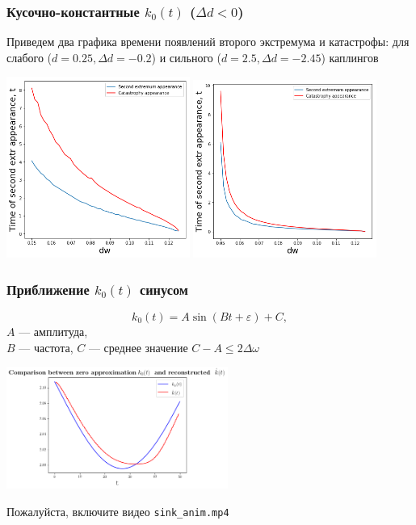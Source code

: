 \documentclass{beamer}
\begin{document}
\begin{frame}
\frametitle{Кусочно-константные $k_0(t)$ ($\Delta d <0$)}
\phantom{123} 
Приведем два графика времени появлений второго экстремума и катастрофы: для слабого ($d=0.25, \Delta d=-0.2$) и сильного ($d=2.5, \Delta d=-2.45$) каплингов
\begin{center}
	\includegraphics[width=0.45\textwidth]{1711_extr_weak.png} %
	\includegraphics[width=0.45\textwidth]{1711_extr_strong.png}
\end{center}
\end{frame}

\begin{frame}
\frametitle{Приближение $k_0(t)$ синусом}
\begin{minipage}{3cm}
	\[
	k_0(t)=A\sin(Bt+\varepsilon)+C,
	\]
	$A$ --- амплитуда, \\ $B$ --- частота, $C$ --- среднее значение
	$C-A \le 2\Delta \omega $
\end{minipage}
\begin{minipage}{7cm}
	\includegraphics[height=4cm]{download.png}
\end{minipage}

\begin{center}
Пожалуйста, включите видео \texttt{sink\_anim.mp4}	
\end{center}
\end{frame}
\end{document}
